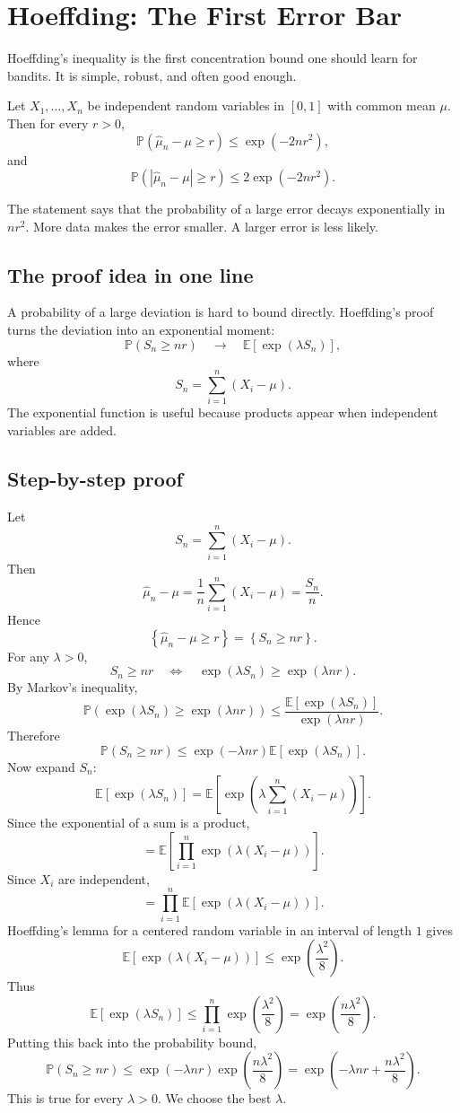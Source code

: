 \documentclass[en,nofont,11pt]{elegantbook}
\newcommand{\E}{\mathbb{E}}
\newcommand{\Pbb}{\mathbb{P}}
\begin{document}
\chapter{Hoeffding: The First Error Bar}

Hoeffding's inequality is the first concentration bound one should learn for bandits. It is simple, robust, and often good enough.

\begin{resultbox}
Let $X_1,\ldots,X_n$ be independent random variables in $[0,1]$ with common mean $\mu$. Then for every $r>0$,
\[
\Pbb\!\left(\widehat\mu_n-\mu\ge r\right) \le \exp(-2nr^2),
\]
and
\[
\Pbb\!\left(|\widehat\mu_n-\mu|\ge r\right) \le 2\exp(-2nr^2).
\]
\end{resultbox}

The statement says that the probability of a large error decays exponentially in $nr^2$. More data makes the error smaller. A larger error is less likely.

\section{The proof idea in one line}

A probability of a large deviation is hard to bound directly. Hoeffding's proof turns the deviation into an exponential moment:
\[
\Pbb(S_n\ge nr)
\quad\longrightarrow\quad
\E[\exp(\lambda S_n)],
\]
where
\[
S_n = \sum_{i=1}^n (X_i-\mu).
\]
The exponential function is useful because products appear when independent variables are added.

\section{Step-by-step proof}

Let
\[
S_n = \sum_{i=1}^{n}(X_i-\mu).
\]
Then
\[
\widehat\mu_n-\mu
= \frac{1}{n}\sum_{i=1}^{n}(X_i-\mu)
= \frac{S_n}{n}.
\]
Hence
\[
\left\{\widehat\mu_n-\mu\ge r\right\}
= \left\{S_n\ge nr\right\}.
\]
For any $\lambda>0$,
\[
S_n\ge nr
\quad\Longleftrightarrow\quad
\exp(\lambda S_n)\ge \exp(\lambda nr).
\]
By Markov's inequality,
\[
\Pbb\!\left(\exp(\lambda S_n)\ge \exp(\lambda nr)\right)
\le
\frac{\E[\exp(\lambda S_n)]}{\exp(\lambda nr)}.
\]
Therefore
\[
\Pbb(S_n\ge nr)
\le
\exp(-\lambda nr)\E[\exp(\lambda S_n)].
\]
Now expand $S_n$:
\[
\E[\exp(\lambda S_n)]
= \E\left[\exp\left(\lambda\sum_{i=1}^{n}(X_i-\mu)\right)\right].
\]
Since the exponential of a sum is a product,
\[
= \E\left[\prod_{i=1}^{n}\exp\left(\lambda(X_i-\mu)\right)\right].
\]
Since $X_i$ are independent,
\[
= \prod_{i=1}^{n}\E\left[\exp\left(\lambda(X_i-\mu)\right)\right].
\]
Hoeffding's lemma for a centered random variable in an interval of length $1$ gives
\[
\E\left[\exp\left(\lambda(X_i-\mu)\right)\right]
\le \exp\left(\frac{\lambda^2}{8}\right).
\]
Thus
\[
\E[\exp(\lambda S_n)]
\le
\prod_{i=1}^{n}\exp\left(\frac{\lambda^2}{8}\right)
= \exp\left(\frac{n\lambda^2}{8}\right).
\]
Putting this back into the probability bound,
\[
\Pbb(S_n\ge nr)
\le
\exp(-\lambda nr)\exp\left(\frac{n\lambda^2}{8}\right)
= \exp\left(-\lambda nr+\frac{n\lambda^2}{8}\right).
\]
This is true for every $\lambda>0$. We choose the best $\lambda$.
\end{document}
